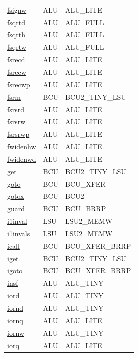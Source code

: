 \begin{small}
\begin{longtable}[l]{l l l}
\hyperlink{lvx.fsignw}{fsignw} & ALU & ALU\_LITE \\ 
\hyperlink{lvx.fsqrtd}{fsqrtd} & ALU & ALU\_FULL \\ 
\hyperlink{lvx.fsqrth}{fsqrth} & ALU & ALU\_FULL \\ 
\hyperlink{lvx.fsqrtw}{fsqrtw} & ALU & ALU\_FULL \\ 
\hyperlink{lvx.fsrecd}{fsrecd} & ALU & ALU\_LITE \\ 
\hyperlink{lvx.fsrecw}{fsrecw} & ALU & ALU\_LITE \\ 
\hyperlink{lvx.fsrecwp}{fsrecwp} & ALU & ALU\_LITE \\ 
\hyperlink{lvx.fsrm}{fsrm} & BCU & BCU2\_TINY\_LSU \\ 
\hyperlink{lvx.fsrsrd}{fsrsrd} & ALU & ALU\_LITE \\ 
\hyperlink{lvx.fsrsrw}{fsrsrw} & ALU & ALU\_LITE \\ 
\hyperlink{lvx.fsrsrwp}{fsrsrwp} & ALU & ALU\_LITE \\ 
\hyperlink{lvx.fwidenhw}{fwidenhw} & ALU & ALU\_LITE \\ 
\hyperlink{lvx.fwidenwd}{fwidenwd} & ALU & ALU\_LITE \\ 
\hyperlink{lvx.get}{get} & BCU & BCU2\_TINY\_LSU \\ 
\hyperlink{lvx.goto}{goto} & BCU & BCU\_XFER \\ 
\hyperlink{lvx.gotox}{gotox} & BCU & BCU2 \\ 
\hyperlink{lvx.guard}{guard} & BCU & BCU\_BRRP \\ 
\hyperlink{lvx.i1inval}{i1inval} & LSU & LSU2\_MEMW \\ 
\hyperlink{lvx.i1invals}{i1invals} & LSU & LSU2\_MEMW \\ 
\hyperlink{lvx.icall}{icall} & BCU & BCU\_XFER\_BRRP \\ 
\hyperlink{lvx.iget}{iget} & BCU & BCU2\_TINY\_LSU \\ 
\hyperlink{lvx.igoto}{igoto} & BCU & BCU\_XFER\_BRRP \\ 
\hyperlink{lvx.insf}{insf} & ALU & ALU\_TINY \\ 
\hyperlink{lvx.iord}{iord} & ALU & ALU\_TINY \\ 
\hyperlink{lvx.iornd}{iornd} & ALU & ALU\_TINY \\ 
\hyperlink{lvx.iornq}{iornq} & ALU & ALU\_LITE \\ 
\hyperlink{lvx.iornw}{iornw} & ALU & ALU\_TINY \\ 
\hyperlink{lvx.iorq}{iorq} & ALU & ALU\_LITE \\ 

\end{longtable}
\end{small}
